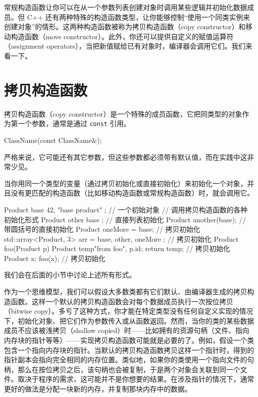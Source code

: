常规构造函数让你可以在从一个参数列表创建对象时调用某些逻辑并初始化数据成员。但 C++ 还有两种特殊的构造函数类型，让你能够控制“使用一个同类实例来创建对象”的情形。这两种构造函数被称为拷贝构造函数（copy constructor）和移动构造函数（move constructor）。此外，你还可以提供自定义的赋值运算符（assignment operators），当把新值赋给已有对象时，编译器会调用它们。我们来看一下。

\section{拷贝构造函数}

拷贝构造函数（copy constructor）是一个特殊的成员函数，它把同类型的对象作为第一个参数，通常是通过 \texttt{const} 引用。

\begin{codebox}[cpp]
ClassName(const ClassName&);
\end{codebox}

严格来说，它可能还有其它参数，但这些参数都必须带有默认值，而在实践中这非常少见。

当你用同一个类型的变量（通过拷贝初始化或直接初始化）来初始化一个对象，并且没有更匹配的构造函数（比如移动构造函数或常规构造函数）时，就会调用它。

\begin{codebox}[cpp]
Product base { 42, "base product" }; // 一个初始对象
// 调用拷贝构造函数的各种初始化形式
Product other { base };
// 直接列表初始化
Product another(base);
// 带圆括号的直接初始化
Product oneMore = base;
// 拷贝初始化
std::array<Product, 3> arr = { base, other, oneMore }; // 拷贝初始化
Product foo(Product p) {
Product temp{"from foo", p.id};
return temp; // 拷贝初始化
}
Product x;
foo(x); // 拷贝初始化
\end{codebox}

我们会在后面的小节中讨论上述所有形式。

作为一个思维模型，我们可以假设大多数类都有它们默认、由编译器生成的拷贝构造函数。这样一个默认的拷贝构造函数会对每个数据成员执行一次按位拷贝（bitwise copy）。多亏了这种方式，你才能在特定类型没有任何自定义实现的情况下，初始化对象、把它们作为参数传入或从函数返回。然而，当你的类的某些数据成员不应该被浅拷贝（shallow copied）时——比如拥有的资源句柄（文件、指向内存块的指针等等）——实现拷贝构造函数可能就是必要的了。例如，假设一个类包含一个指向内存块的指针。当默认的拷贝构造函数拷贝这样一个指针时，得到的指针副本会指向完全相同的内存位置。类似地，如果你的类使用一个指向文件的句柄，那么在按位拷贝之后，该句柄也会被复制，于是两个对象会关联到同一个文件。取决于程序的需求，这可能并不是你想要的结果。在涉及指针的情况下，通常更好的做法是分配一块新的内存，并复制那块内存中的数据。

